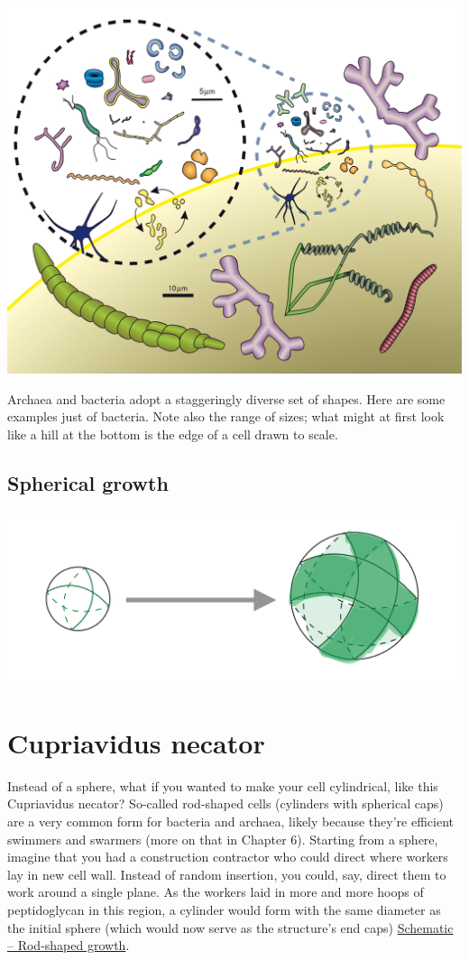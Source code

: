\documentclass[]{tufte-book}
\begin{document}
\includegraphics{img/03_schematic/3_1_1_YoungShapes}

Archaea and bacteria adopt a staggeringly diverse set of shapes. Here
are some examples just of bacteria. Note also the range of sizes; what
might at first look like a hill at the bottom is the edge of a cell
drawn to scale.

\hypertarget{Spherical_growth}{\subsection{Spherical
growth}\label{Spherical_growth}}

\includegraphics{img/03_schematic/3_1_2_SphericalGrowth}

\section{Cupriavidus necator}\label{cupriavidus-necator-1}

Instead of a sphere, what if you wanted to make your cell cylindrical,
like this Cupriavidus necator? So-called rod-shaped cells (cylinders
with spherical caps) are a very common form for bacteria and archaea,
likely because they're efficient swimmers and swarmers (more on that in
Chapter 6). Starting from a sphere, imagine that you had a construction
contractor who could direct where workers lay in new cell wall. Instead
of random insertion, you could, say, direct them to work around a single
plane. As the workers laid in more and more hoops of peptidoglycan in
this region, a cylinder would form with the same diameter as the initial
sphere (which would now serve as the structure's end caps)
\protect\hyperlink{Rod-shaped_growth}{Schematic -- Rod-shaped growth}.
\end{document}
